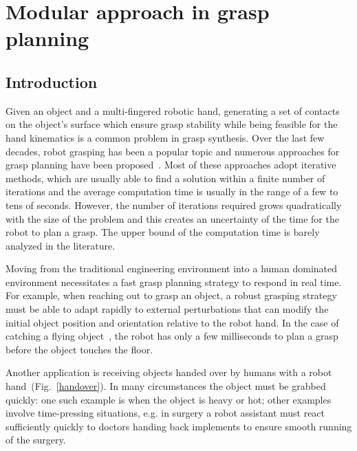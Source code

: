 \chapter{Modular approach in grasp planning}
\label{cha3}

\section{Introduction}
\label{cha3:sec1}


Given an object and a multi-fingered robotic hand,
generating a set of contacts on the object's surface which ensure grasp stability while being feasible for the hand kinematics is a common problem in grasp synthesis. Over the last few decades, robot grasping has been a popular topic and numerous approaches for grasp planning have been proposed~\cite{sahbani2011overview}. Most of these approaches adopt iterative methods, which are usually able to find a solution within a finite number of iterations and the average computation time is usually in the range of a few to tens of seconds. However, the number of iterations required grows quadratically with the size of the problem and this creates an uncertainty of the time for the robot to plan a grasp. The upper bound of the computation time is barely analyzed in the literature.


Moving from the traditional engineering environment into a human dominated environment necessitates a fast grasp planning strategy to respond in real time. For example, when reaching out to grasp an object, a robust grasping strategy must be able to adapt rapidly to external perturbations that can modify the initial object position and orientation relative to the robot hand. In the case of catching a flying object~\cite{kim2012}, the robot has only a few milliseconds to plan a grasp before the object touches the floor.

Another application is receiving objects handed over by humans with a robot hand~(Fig.~\ref{handover}). In many circumstances the object must be grabbed quickly: one such example is when the object is heavy or hot; other examples involve time-pressing situations, e.g. in surgery a robot assistant must react sufficiently quickly to doctors handing back implements to ensure smooth running of the surgery.

